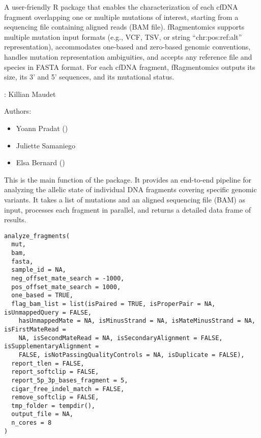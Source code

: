 \documentclass[a4paper]{book}
\begin{document}
%
\begin{Description}
A user-friendly R package that enables the characterization of each cfDNA fragment overlapping one or multiple mutations of interest, starting from a sequencing file containing aligned reads (BAM file). fRagmentomics supports multiple mutation input formats (e.g., VCF, TSV, or string “chr:pos:ref:alt” representation), accommodates one-based and zero-based genomic conventions, handles mutation representation ambiguities, and accepts any reference file and species in FASTA format. For each cfDNA fragment, fRagmentomics outputs its size, its 3’ and 5’ sequences, and its mutational status.
\end{Description}
%
\begin{Author}
: Killian Maudet 

Authors:
\begin{itemize}

\item{} Yoann Pradat  ()
\item{} Juliette Samaniego 
\item{} Elsa Bernard  ()

\end{itemize}


\end{Author}
%
\begin{Description}
This is the main function of the package. It provides an end-to-end pipeline for analyzing the allelic state of
individual DNA fragments covering specific genomic variants. It takes a list of mutations and an aligned sequencing
file (BAM) as input, processes each fragment in parallel, and returns a detailed data frame of results.
\end{Description}
%
\begin{Usage}
\begin{verbatim}
analyze_fragments(
  mut,
  bam,
  fasta,
  sample_id = NA,
  neg_offset_mate_search = -1000,
  pos_offset_mate_search = 1000,
  one_based = TRUE,
  flag_bam_list = list(isPaired = TRUE, isProperPair = NA, isUnmappedQuery = FALSE,
    hasUnmappedMate = NA, isMinusStrand = NA, isMateMinusStrand = NA, isFirstMateRead =
    NA, isSecondMateRead = NA, isSecondaryAlignment = FALSE, isSupplementaryAlignment =
    FALSE, isNotPassingQualityControls = NA, isDuplicate = FALSE),
  report_tlen = FALSE,
  report_softclip = FALSE,
  report_5p_3p_bases_fragment = 5,
  cigar_free_indel_match = FALSE,
  remove_softclip = FALSE,
  tmp_folder = tempdir(),
  output_file = NA,
  n_cores = 8
)
\end{verbatim}
\end{Usage}
\end{document}
